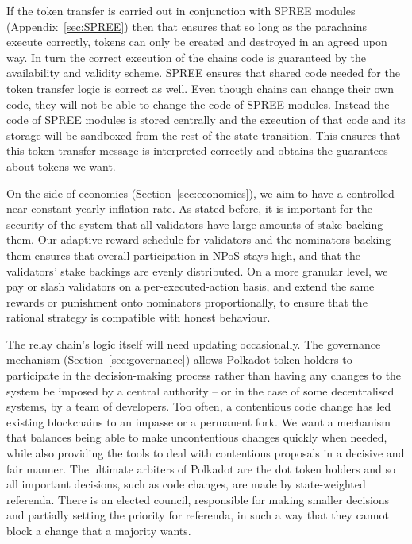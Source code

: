 If the token transfer is carried out in conjunction with SPREE modules (Appendix~\ref{sec:SPREE}) then that ensures that so long as the parachains execute correctly, tokens can only be created and destroyed in an agreed upon way. In turn the correct execution of the chains code is guaranteed by the availability and validity scheme. SPREE ensures that shared code needed for the token transfer logic is correct as well. Even though chains can change their own code, they will not be able to change the code of SPREE modules. Instead the code of SPREE modules is stored centrally and the execution of that code and its storage will be sandboxed from the rest of the state transition. This ensures that this token transfer message is interpreted correctly and obtains the guarantees about tokens we want. %

On the side of economics (Section~\ref{sec:economics}), we aim to have a controlled near-constant yearly inflation rate. As stated before, it is important for the security of the system that all validators have large amounts of stake backing them. Our adaptive reward schedule for validators and the nominators backing them ensures that overall participation in NPoS stays high, and that the validators' stake backings are evenly distributed. On a more granular level, we pay or slash validators on a per-executed-action basis, and extend the same rewards or punishment onto nominators proportionally, to ensure that the rational strategy is compatible with honest behaviour.

The relay chain's logic itself will need updating occasionally. The governance mechanism (Section~\ref{sec:governance}) allows Polkadot token holders to participate in the decision-making process rather than having any changes to the system be imposed by a central authority -- or in the case of some decentralised systems, by a team of developers. Too often, a contentious code change has led existing blockchains to an impasse or a permanent fork. 
We want a mechanism that balances being able to make uncontentious changes quickly when needed, while also providing the tools to deal with contentious proposals in a decisive and fair manner. The ultimate arbiters of Polkadot are the dot token holders and so all important decisions, such as code changes, are made by state-weighted referenda. There is an elected council, responsible for making smaller decisions and partially setting the priority for referenda, in such a way that they cannot block a change that a majority wants.

